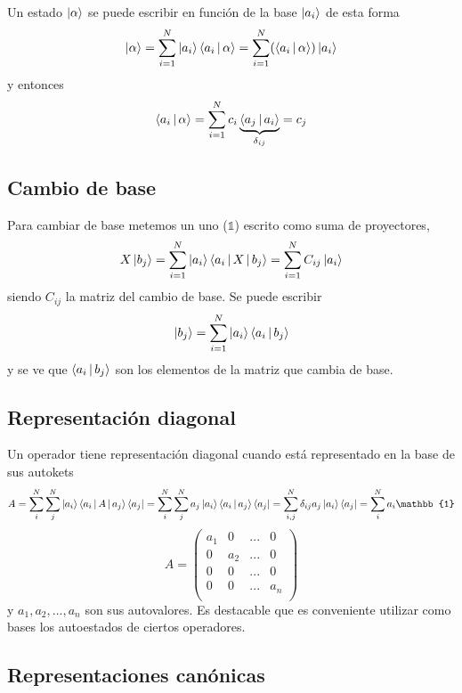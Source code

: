 \documentclass[10pt,oneside]{CBFT_book}
\begin{document}
Un estado $\Ket{\alpha}$ se puede escribir en función de la base $\Ket{a_i}$ de esta forma 
\[
	\Ket{\alpha} = \sum_{i=1}^N \Ket{a_i}\Braket{a_i|\alpha} = 
		\sum_{i=1}^N (\Braket{a_i|\alpha}) \Ket{a_i}
\]
y entonces
\[
	\Braket{a_i|\alpha} = \sum_{i=1}^N c_i \underbrace{\Braket{a_j|a_i}}_{\delta_{ij}} = c_j 
\]

\subsection{Cambio de base}

Para cambiar de base metemos un uno ($\mathbb{1}$) escrito como suma de proyectores,
\[
	X\Ket{b_j} = \sum_{i=1}^N \Ket{a_i}\Braket{a_i|X|b_j} = \sum_{i=1}^N C_{ij} \Ket{a_i}
\]
siendo $C_{ij}$ la matriz del cambio de base.
Se puede escribir
\[
	\Ket{b_j} = \sum_{i=1}^N \Ket{a_i}\Braket{a_i|b_j} 
\]
y se ve que $\Braket{a_i|b_j}$ son los elementos de la matriz que cambia de base.

\subsection{Representación diagonal}

Un operador tiene representación diagonal cuando está representado en la base de sus
autokets
\[
	A = \sum_i^N\sum_j^N \Ket{a_i}\Braket{a_i|A|a_j}\Bra{a_j} =
		\sum_i^N\sum_j^N a_j\Ket{a_i}\Braket{a_i|a_j}\Bra{a_j} =
		\sum_{i,j}^N \delta_{ij} a_j \Ket{a_i}\Bra{a_j} = \sum_i^N a_i \mathbb{1}
\]
\[
	A = \begin{pmatrix} 
		a_1 & 0 & ... & 0 \\
		0 & a_2 & ... & 0 \\
		0 & 0 & ... & 0 \\
		0 & 0 & ... & a_n \\
	\end{pmatrix}
\]
y $a_1,a_2,...,a_n$ son sus autovalores.
Es destacable que es conveniente utilizar como bases los autoestados de ciertos operadores.

\subsection{Representaciones canónicas}
\end{document}
